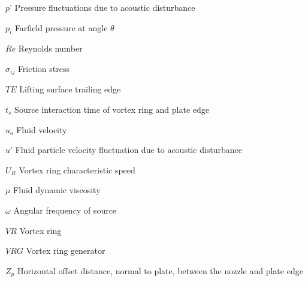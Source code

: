 \begin{eqlist}
\item[$p$'] Pressure fluctuations due to acoustic disturbance

\item[$p_i$] Farfield pressure at angle $\theta$

\item[$Re$] Reynolds number

\item[$\sigma_{ij}$] Friction stress

\item[$TE$] Lifting surface trailing edge

\item[$t_s$] Source interaction time of vortex ring and plate edge

\item[$u_o$] Fluid velocity

\item[$u$'] Fluid particle velocity fluctuation due to acoustic disturbance

\item[$U_R$] Vortex ring characteristic speed

\item[$\mu$] Fluid dynamic viscosity

\item[$\omega$] Angular frequency of source

\item[$VR$] Vortex ring

\item[$VRG$] Vortex ring generator

\item[$Z_p$] Horizontal offset distance, normal to plate, between the nozzle and plate edge

\end{eqlist}

